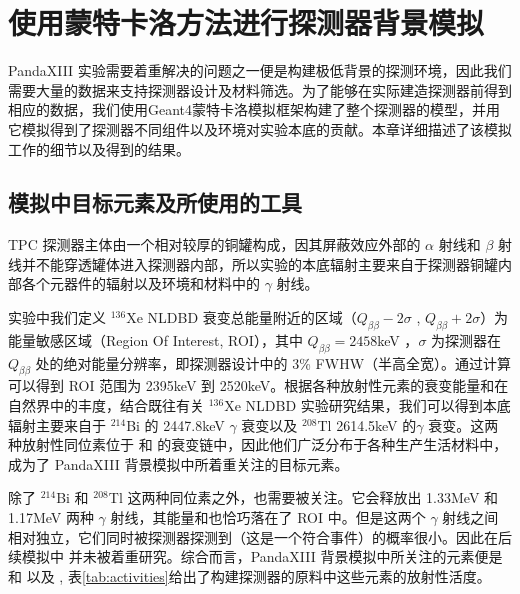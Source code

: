 \chapter{使用蒙特卡洛方法进行探测器背景模拟}
\label{chapter:background}

PandaXIII 实验需要着重解决的问题之一便是构建极低背景的探测环境，因此我们需要大量的数据来支持探测器设计及材料筛选。为了能够在实际建造探测器前得到相应的数据，我们使用Geant4\supercite{Agostinelli:2002hh}蒙特卡洛模拟框架构建了整个探测器的模型，并用它模拟得到了探测器不同组件以及环境对实验本底的贡献。本章详细描述了该模拟工作的细节以及得到的结果。

\section{模拟中目标元素及所使用的工具}

 TPC 探测器主体由一个相对较厚的铜罐构成，因其屏蔽效应外部的 $\alpha$ 射线和 $\beta$ 射线并不能穿透罐体进入探测器内部，所以实验的本底辐射主要来自于探测器铜罐内部各个元器件的辐射以及环境和材料中的 $\gamma$ 射线。

实验中我们定义 $^{136}$Xe NLDBD 衰变总能量附近的区域（$Q_{\beta\beta}-2\sigma$ , $Q_{\beta\beta}+2\sigma$）为能量敏感区域（Region Of Interest, ROI），其中 $Q_{\beta\beta}=2458$keV ，$\sigma$ 为探测器在 $Q_{\beta\beta}$ 处的绝对能量分辨率，即探测器设计中的 3\% FWHW（半高全宽）。通过计算可以得到 ROI 范围为 2395keV 到 2520keV。根据各种放射性元素的衰变能量和在自然界中的丰度，结合既往有关 $^{136}$Xe NLDBD 实验研究结果，我们可以得到本底辐射主要来自于 $^{214}$Bi 的 2447.8keV $\gamma$ 衰变以及 $^{208}$Tl  2614.5keV 的$\gamma$ 衰变。这两种放射性同位素位于 \utte 和 \thttt 的衰变链中，因此他们广泛分布于各种生产生活材料中，成为了 PandaXIII 背景模拟中所着重关注的目标元素。

除了 $^{214}$Bi 和 $^{208}$Tl 这两种同位素之外，\cose 也需要被关注。它会释放出 1.33MeV 和 1.17MeV 两种 $\gamma$ 射线，其能量和也恰巧落在了 ROI 中。但是这两个 $\gamma$ 射线之间相对独立，它们同时被探测器探测到（这是一个符合事件）的概率很小。因此在后续模拟中 \cose 并未被着重研究。综合而言，PandaXIII 背景模拟中所关注的元素便是 \utte 和 \thttt 以及 \cose  , 表\ref{tab:activities}给出了构建探测器的原料中这些元素的放射性活度。

